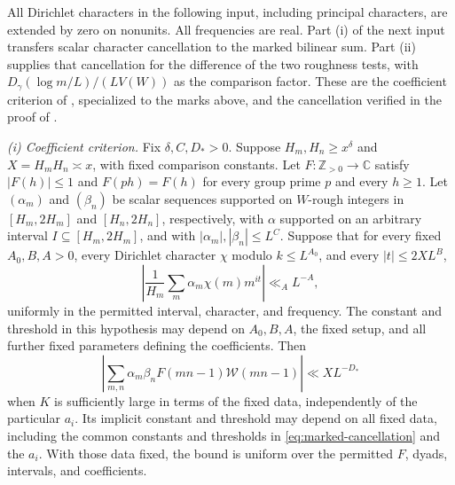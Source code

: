 All Dirichlet characters in the following input, including principal
characters, are extended by zero on nonunits.  All frequencies are real.
Part (i) of the next input transfers scalar character cancellation to the
marked bilinear sum.  Part (ii) supplies that cancellation for the
difference of the two roughness tests, with
\(D_\gamma(\log m/L)/(LV(W))\) as the comparison factor.
These are the coefficient criterion of
\cite[Lemma~10.2]{PrimitiveRoot2}, specialized to the marks above, and the
cancellation verified in the proof of
\cite[Proposition~10.3]{PrimitiveRoot2}.

\begin{hypothesis}\label{input:marked}
\emph{(i) Coefficient criterion.}
Fix \(\delta,C,D_*>0\).  Suppose \(H_m,H_n\ge x^\delta\) and
\(X=H_mH_n\asymp x\), with fixed comparison constants.  Let
\(F:\mathbb Z_{>0}\to\mathbb C\) satisfy \(|F(h)|\le1\) and
\(F(ph)=F(h)\) for every group prime \(p\) and every \(h\ge1\).
Let \((\alpha_m)\) and \((\beta_n)\) be scalar sequences supported on
\(W\)-rough integers in \([H_m,2H_m]\) and \([H_n,2H_n]\), respectively,
with \(\alpha\) supported on an arbitrary interval
\(I\subseteq[H_m,2H_m]\), and with
\(|\alpha_m|,|\beta_n|\le L^C\).  Suppose that for every fixed
\(A_0,B,A>0\), every Dirichlet character \(\chi\) modulo
\(k\le L^{A_0}\), and every \(|t|\le2XL^B\),
\begin{equation}\label{eq:marked-cancellation}
 \left|\frac1{H_m}\sum_m\alpha_m\chi(m)m^{it}\right|\ll_A L^{-A},
\end{equation}
uniformly in the permitted interval, character, and frequency.  The
constant and threshold in this hypothesis may depend on \(A_0,B,A\),
the fixed setup, and all further fixed parameters defining the
coefficients.  Then
\begin{equation}\label{eq:marked-input-bound}
 \left|\sum_{m,n}\alpha_m\beta_n F(mn-1)\mathcal W(mn-1)\right|
       \ll XL^{-D_*}
\end{equation}
when \(K\) is sufficiently large in terms of the fixed data, independently
of the particular \(a_i\).  Its implicit constant and threshold may depend
on all fixed data, including the common constants and thresholds in
\eqref{eq:marked-cancellation} and the \(a_i\).  With those data fixed, the
bound is uniform over the permitted \(F\), dyads, intervals, and
coefficients.


\end{hypothesis}

